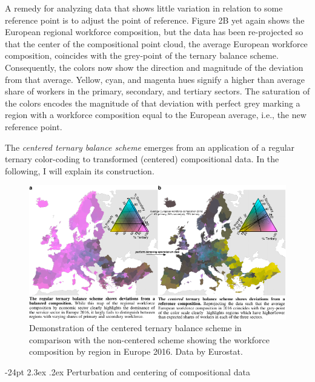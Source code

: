 \documentclass[10pt, twoside, parskip=half]{article}
\makeatletter
\def\maxwidth{\ifdim\Gin@nat@width>\linewidth\linewidth
\else\Gin@nat@width\fi}
\let\Oldincludegraphics\includegraphics
\renewcommand{\includegraphics}[1]{\Oldincludegraphics[width=\maxwidth]{#1}}
\renewcommand\section{\@startsection {section}{1}{\z@}%
                                   {-24pt}%
                                   {2.3ex \@plus.2ex}%
                                   {\normalfont\large\bfseries}}
\makeatother
\begin{document}
A remedy for analyzing data that shows little variation in relation to
some reference point is to adjust the point of reference. Figure 2B yet
again shows the European regional workforce composition, but the data
has been re-projected so that the center of the compositional point
cloud, the average European workforce composition, coincides with the
grey-point of the ternary balance scheme. Consequently, the colors now
show the direction and magnitude of the deviation from that average.
Yellow, cyan, and magenta hues signify a higher than average share of
workers in the primary, secondary, and tertiary sectors. The saturation
of the colors encodes the magnitude of that deviation with perfect grey
marking a region with a workforce composition equal to the European
average, i.e., the new reference point.

The \emph{centered ternary balance scheme} emerges from an application
of a regular ternary color-coding to transformed (centered)
compositional data. In the following, I will explain its construction.

\begin{figure}

{\centering \includegraphics{figure2} 

}

\caption{Demonstration of the centered ternary balance scheme in comparison with the non-centered scheme showing the workforce composition by region in Europe 2016. Data by Eurostat.}\label{fig:unnamed-chunk-2}
\end{figure}

\hypertarget{perturbation-and-centering-of-compositional-data}{%
\section{Perturbation and centering of compositional
data}\label{perturbation-and-centering-of-compositional-data}}
\end{document}
